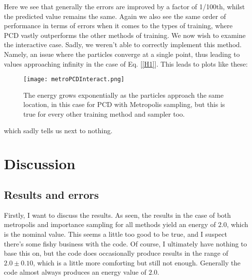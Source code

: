 \documentclass{article}
\begin{document}
\newline
Here we see that generally the errors are improved by a factor of 1/100th, whilst the predicted value remains the same. Again we also see the same order of performance in terms of errors when it comes to the types of training, where PCD vastly outperforms the other methods of training. \newpage
We now wish to examine the interactive case. Sadly, we weren't able to correctly implement this method. Namely, an issue where the particles converge at a single point, thus leading to values approaching infinity in the case of Eq. [\ref{H1}]. This leads to plots like these:
\begin{figure}[ht!]
    \centering
    \texttt{[image: metroPCDInteract.png]}
    \caption{The energy grows exponentially as the particles approach the same location, in this case for PCD with Metropolis sampling, but this is true for every other training method and sampler too.}
    \label{figInfinity}
\end{figure}
\newline
which sadly tells us next to nothing.
\section{Discussion}
\subsection{Results and errors}
Firstly, I want to discuss the results. As seen, the results in the case of both metropolis and importance sampling for all methods yield an energy of $2.0$, which is the nominal value. This seems a little too good to be true, and I suspect there's some fishy business with the code. Of course, I ultimately have nothing to base this on, but the code does occasionally produce results in the range of $2.0 \pm 0.10$, which is a little more comforting but still not enough. Generally the code almost always produces an energy value of $2.0$.
\end{document}
